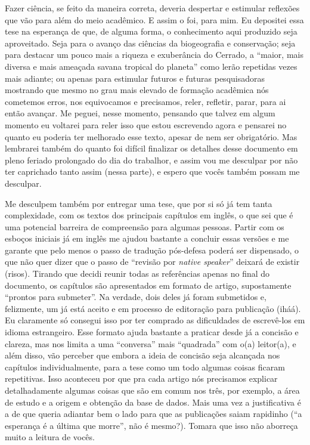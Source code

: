\documentclass[12pt,openright,oneside,a4paper,english]{abntex2}
\begin{document}

Fazer ciência, se feito da maneira correta, deveria despertar e estimular reflexões que vão para além do meio acadêmico. E assim o foi, para mim. Eu depositei essa tese na esperança de que, de alguma forma, o conhecimento aqui produzido seja aproveitado. Seja para o avanço das ciências da biogeografia e conservação; seja para destacar um pouco mais a riqueza e exuberância do Cerrado, a “maior, mais diversa e mais ameaçada savana tropical do planeta” como lerão repetidas vezes mais adiante; ou apenas para estimular futuros e futuras pesquisadoras mostrando que mesmo no grau mais elevado de formação acadêmica nós cometemos erros, nos equivocamos e precisamos, reler, refletir, parar, para ai então avançar. Me peguei, nesse momento, pensando que talvez em algum momento eu voltarei para reler isso que estou escrevendo agora e pensarei no quanto eu poderia ter melhorado esse texto, apesar de nem ser obrigatório. Mas lembrarei também do quanto foi difícil finalizar os detalhes desse documento em pleno feriado prolongado do dia do trabalhor, e assim vou me desculpar por não ter caprichado tanto assim (nessa parte), e espero que vocês também possam me desculpar. 

Me desculpem também por entregar uma tese, que por si só já tem tanta complexidade, com os textos dos principais capítulos em inglês, o que sei que é uma potencial barreira de compreensão para algumas pessoas. Partir com os esboços iniciais já em inglês me ajudou bastante a concluir essas versões e me garante que pelo menos o passo de tradução pós-defesa poderá ser dispensado, o que não quer dizer que o passo de “revisão por \textit{native speaker}” deixará de existir (risos). Tirando que decidi reunir todas as referências apenas no final do documento, os capítulos são apresentados em formato de artigo, supostamente “prontos para submeter”. Na verdade, dois deles já foram submetidos e, felizmente, um já está aceito e em processo de editoração para publicação (iháá). Eu claramente só consegui isso por ter comprado as dificuldades de escrevê-los em idioma estrangeiro. Esse formato ajuda bastante a praticar desde já a concisão e clareza, mas nos limita a uma “conversa” mais “quadrada” com o(a) leitor(a), e além disso, vão perceber que embora a ideia de concisão seja alcançada nos capítulos individualmente, para a tese como um todo algumas coisas ficaram repetitivas. Isso aconteceu por que pra cada artigo nós precisamos explicar detalhadamente algumas coisas que são em comum nos três, por exemplo, a área de estudo e a origem e obtenção da base de dados. Mais uma vez a justificativa é a de que queria adiantar bem o lado para que as publicações saiam rapidinho (“a esperança é a última que morre”, não é mesmo?). Tomara que isso não aborreça muito a leitura de vocês.
\end{document}
